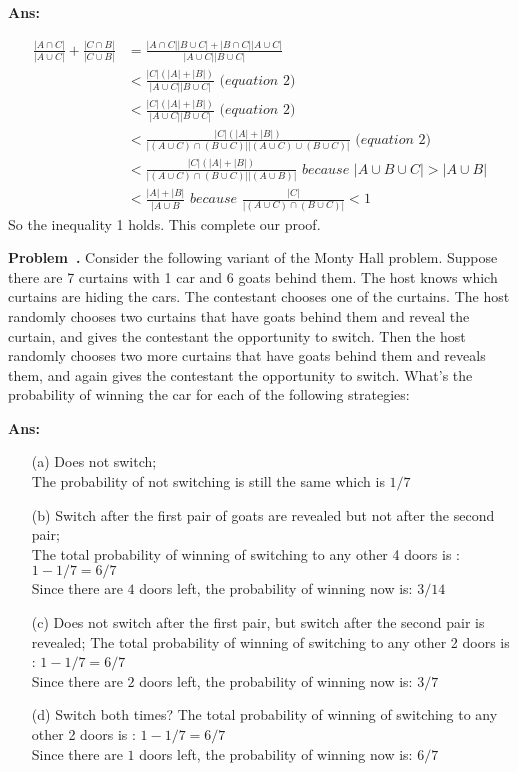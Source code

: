\documentclass{article}
\newcounter{problem}[section]
\newenvironment{problem}[1][]{\refstepcounter{problem}\par\medskip
   \noindent \textbf{Problem~\theproblem. #1} \rmfamily}{\medskip}
\newenvironment{proof}{\begin{mdframed}\textbf{Ans:}}{ \end{mdframed}}
\begin{document}
\begin{proof}
\begin{itemize}
		\begin{equation}
		\begin{split}
			\frac{|A\cap C|}{|A\cup C|} +  \frac{|C\cap B|}{|C\cup B|} &= \frac{|A\cap C||B\cup C| + |B \cap C||A\cup C|}{|A\cup C||B\cup C|}\\
			&< \frac{|C|(|A|+|B|)}{|A\cup C||B\cup C|} \textit{ (equation 2)}\\
 			&< \frac{|C|(|A|+|B|)}{|A\cup C||B\cup C|} \textit{ (equation 2)}\\
			&< \frac{|C|(|A|+|B|)}{|(A\cup C)\cap (B\cup C)| |(A\cup C)\cup (B\cup C)|}\textit{ (equation 2)}\\
			&< \frac{|C|(|A|+|B|)}{|(A\cup C)\cap (B\cup C)| |(A\cup B)|}\textit{ because } |A\cup B \cup C| > |A\cup B|\\
			&< \frac{|A|+|B|}{|A \cup B} \textit{ because } \frac{|C|}{|(A\cup C)\cap (B\cup C)|} < 1 
		\end{split}
		\end{equation}
		So the inequality 1 holds. This complete our proof. 
	\end{itemize}
\end{proof}
\begin{problem}
	Consider the following variant of the Monty Hall problem. Suppose there are 7 curtains with 1 car and 6 goats behind them. The host knows which curtains are hiding the cars. The contestant chooses one of the curtains. The host randomly chooses two curtains that have goats behind them and reveal the curtain, and gives the contestant the opportunity to switch. Then the host randomly chooses two more curtains that have goats behind them and reveals them, and again gives the contestant the opportunity to switch. What’s the probability of winning the car for each of the following strategies:
	\begin{proof}
	\begin{itemize}
	\item[(a)] Does not switch; \\
		The probability of not switching is still the same which is $1/7$
	\item[(b)] Switch after the first pair of goats are revealed but not after the second pair;\\
		The total probability of winning of switching to any other 4 doors is : $1-1/7=6/7$\\
		Since there are $4$ doors left, the probability of winning now is: $3/14$	
	\item[(c)] Does not switch after the first pair, but switch after the second pair is revealed;
		The total probability of winning of switching to any other 2 doors is : $1-1/7=6/7$ \\
		Since there are $2$ doors left, the probability of winning now is: $3/7$	
	\item[(d)] Switch both times?
		The total probability of winning of switching to any other 2 doors is : $1-1/7=6/7$ \\
		Since there are $1$ doors left, the probability of winning now is: $6/7$
	\end{itemize}
	\end{proof}
\end{problem}
\end{document}
